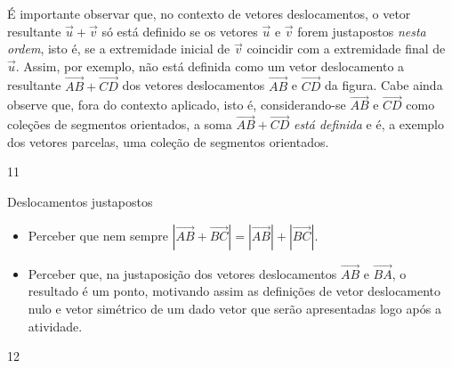 \clearmargin
\begin{sugestions}{}
{
É importante observar que, no contexto de vetores deslocamentos, o vetor resultante \(\vec{u} + \vec{v}\) só está definido se os vetores \(\vec{u}\) e \(\vec{v}\) forem justapostos \textit{nesta ordem}, isto é, se  a extremidade inicial de \(\vec{v}\) coincidir com a extremidade final de \(\vec{u}\). Assim, por exemplo, não está definida como um vetor deslocamento a
resultante \(\overrightarrow{AB} + \overrightarrow{CD}\) dos vetores deslocamentos \(\overrightarrow{AB}\) e \(\overrightarrow{CD}\) da figura. Cabe ainda observe que, fora do contexto aplicado, isto é, considerando-se \(\overrightarrow{AB}\) e \(\overrightarrow{CD}\) como coleções de segmentos orientados, a soma \(\overrightarrow{AB} + \overrightarrow{CD}\) \textit{está definida} e é, a exemplo dos vetores parcelas, uma coleção de segmentos orientados.

\begin{center}
\end{center}
}{1}{1}
\end{sugestions}
\clearmargin
\begin{objectives}{Deslocamentos justapostos}
{
\begin{itemize}
\item {} 
Perceber que nem sempre \(|\overrightarrow{AB} + \overrightarrow{BC}| = |\overrightarrow{AB}| + |\overrightarrow{BC}|\).

\item {} 
Perceber que, na justaposição dos vetores deslocamentos \(\overrightarrow{AB}\) e \(\overrightarrow{BA}\), o resultado é um ponto, motivando assim as definições de vetor deslocamento nulo e vetor simétrico de um dado vetor que serão apresentadas logo após a atividade.
\end{itemize}
}{1}{2}
\end{objectives}
